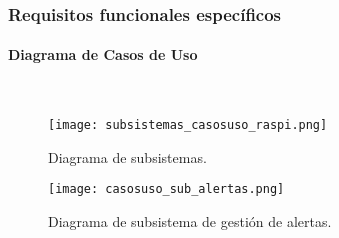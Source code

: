             \begin{table}[H]
                \centering
                \caption{Objetivo 4 del nodo central: Alertar mediante smartphone.}
               \label{sys_obj4}
            \end{table}
        
            \subsubsection{Requisitos funcionales específicos}
            
                \paragraph{Diagrama de Casos de Uso}\mbox{}\\
                
                \begin{figure}[!ht]
                  \centering
                    \texttt{[image: subsistemas\_casosuso\_raspi.png]}
                  \caption{Diagrama de subsistemas.}
                  \label{subsistemas_casosuso_raspi}
                \end{figure}
                
                \begin{figure}[H]
                  \centering
                    \texttt{[image: casosuso\_sub\_alertas.png]}
                  \caption{Diagrama de subsistema de gestión de alertas.}
                  \label{casosuso_sub_alertas}
                \end{figure}
                

